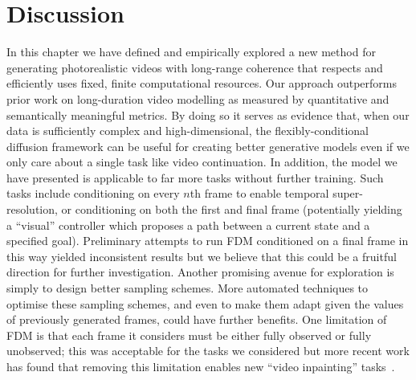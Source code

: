 \section{Discussion}
In this chapter we have defined and empirically explored a new method for generating photorealistic videos with long-range coherence that respects and efficiently uses fixed, finite computational resources.
Our approach outperforms prior work on long-duration video modelling as measured by quantitative and semantically meaningful metrics. By doing so it serves as evidence that, when our data is sufficiently complex and high-dimensional, the flexibly-conditional diffusion framework can be useful for creating better generative models even if we only care about a single task like video continuation. In addition, the model we have presented is applicable to far more tasks without further training. Such tasks include conditioning on every $n$th frame to enable temporal super-resolution, or conditioning on both the first and final frame (potentially yielding a ``visual'' controller which proposes a path between a current state and a specified goal). Preliminary attempts to run FDM conditioned on a final frame in this way yielded inconsistent results but we believe that this could be a fruitful direction for further investigation. Another promising avenue for exploration is simply to design better sampling schemes. More automated techniques to optimise these sampling schemes, and even to make them adapt given the values of previously generated frames, could have further benefits. One limitation of FDM is that each frame it considers must be either fully observed or fully unobserved; this was acceptable for the tasks we considered but more recent work has found that removing this limitation enables new ``video inpainting'' tasks~\citep{green2024semantically}.
